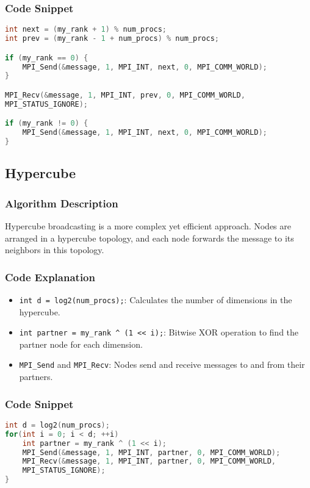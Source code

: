 \documentclass[11pt]{article}
\begin{document}
\subsubsection{Code Snippet}
\begin{lstlisting}[language=C++, caption=Key part of Sequential Ring]
int next = (my_rank + 1) % num_procs;
int prev = (my_rank - 1 + num_procs) % num_procs;

if (my_rank == 0) {
    MPI_Send(&message, 1, MPI_INT, next, 0, MPI_COMM_WORLD);
}

MPI_Recv(&message, 1, MPI_INT, prev, 0, MPI_COMM_WORLD, 
MPI_STATUS_IGNORE);

if (my_rank != 0) {
    MPI_Send(&message, 1, MPI_INT, next, 0, MPI_COMM_WORLD);
}
\end{lstlisting}

\subsection{Hypercube}

\subsubsection{Algorithm Description}
Hypercube broadcasting is a more complex yet efficient approach. Nodes are arranged in a hypercube topology, and each node forwards the message to its neighbors in this topology.

\subsubsection{Code Explanation}
\begin{itemize}
    \item \texttt{int d = log2(num\_procs);}: Calculates the number of dimensions in the hypercube.
    \item \texttt{int partner = my\_rank \^{} (1 << i);}: Bitwise XOR operation to find the partner node for each dimension.
    \item \texttt{MPI\_Send} and \texttt{MPI\_Recv}: Nodes send and receive messages to and from their partners.
\end{itemize}

\subsubsection{Code Snippet}
\begin{lstlisting}[language=C++, caption=Key part of Hypercube]
int d = log2(num_procs);
for(int i = 0; i < d; ++i) 
    int partner = my_rank ^ (1 << i);
    MPI_Send(&message, 1, MPI_INT, partner, 0, MPI_COMM_WORLD);
    MPI_Recv(&message, 1, MPI_INT, partner, 0, MPI_COMM_WORLD, 
    MPI_STATUS_IGNORE);
}
\end{lstlisting}
\end{document}
